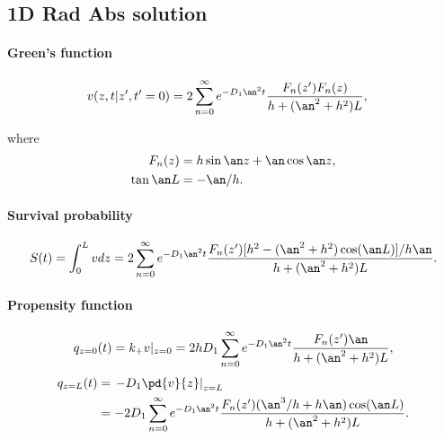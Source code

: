 \subsection{1D Rad Abs solution}


\paragraph{Green's function}
\begin{align}
  v(z,t|z',t'=0) &= 2\sum_{n=0}^{\infty}
  e^{-D_1\an^2t} \frac
  { F_n(z')F_n(z) }
  {h + (\an^2 + h^2)L},
\end{align}

where
\begin{align}
  F_n(z) &= h\sin\an z +  \an\cos\an z  , \\
  \tan\an L &= -\an/h.
\end{align}


\paragraph{Survival probability}
\begin{align}
  S(t) = \int_0^Lvdz
  = 2\sum_{n=0}^{\infty} e^{-D_1\an^2t}
    \frac{F_n(z')
[h^2 - (\an^2 + h^2) \cos(\an L)] /h\an }
  {h + (\an^2 + h^2)L}.
\end{align}


\paragraph{Propensity function}
\begin{align}
  q_{z=0}(t) = k_+ v|_{z=0} = 2hD_1 \sum_{n=0}^{\infty} e^{-D_1\an^2t}
  \frac{ F_n(z') \an} {h + (\an^2 + h^2)L},
\end{align}
\begin{align}
  q_{z=L}(t) &= \left.- D_1 \pd{v}{z}\right|_{z=L} \\
  &=  -2D_1 \sum_{n=0}^{\infty} e^{-D_1\an^2t}
    \frac{F_n(z') (\an^3/h + h\an)\cos(\an L)}
  {h + (\an^2 + h^2)L}.
\end{align}

